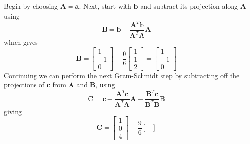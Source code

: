 \begin{mdframed}[style=MyFrame]
    Begin by choosing $\mathbf{A}=\mathbf{a}$. Next, start with
    $\mathbf{b}$ and subtract its projection along $\mathbf{A}$ using 
    \begin{equation}
        \mathbf{B} =  \mathbf{b} 
                        - \frac{\mathbf{A}^{T} \mathbf{b} }
                                {\mathbf{A}^{T} \mathbf{A}}
                                \mathbf{A}
    \end{equation}
    which gives
    \begin{equation}
        \mathbf{B} = 
        \begin{bmatrix}
            1       \\
            -1      \\
            0
        \end{bmatrix}
        -
        \frac{0}{6}
        \begin{bmatrix}
            1       \\
            1       \\
            2
        \end{bmatrix}
        =
        \begin{bmatrix}
            1       \\
            -1      \\
            0
        \end{bmatrix}
    \end{equation}
    Continuing we can perform the next Gram-Schmidt step by subtracting off
    the projections of $\mathbf{c}$ from $\mathbf{A}$ and $\mathbf{B}$,
    using
    \begin{equation}
        \mathbf{C} =  \mathbf{c} 
                        - \frac{\mathbf{A}^{T} \mathbf{c} }
                                {\mathbf{A}^{T} \mathbf{A}}
                                \mathbf{A}
                        - \frac{\mathbf{B}^{T} \mathbf{c} }
                                {\mathbf{B}^{T} \mathbf{B}}
                                \mathbf{B}
    \end{equation}
    giving
    \begin{equation}
        \mathbf{C} = 
        \begin{bmatrix}
            1       \\
            0       \\
            4
        \end{bmatrix}
        -
        \frac{9}{6}
        \begin{bmatrix}

\end{bmatrix}
\end{equation}
\end{mdframed}
